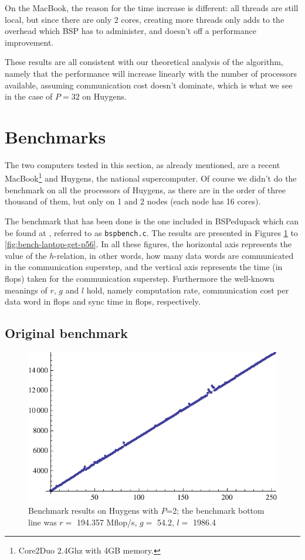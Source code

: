 \documentclass[a4paper]{article}
\begin{document}
On the MacBook, the reason for the time increase is different: all threads are
still local, but since there are only 2 cores, creating more threads only adds
to the overhead which BSP has to administer, and doesn't off a performance
improvement. 

These results are all consistent with our theoretical analysis of the algorithm,
namely that the performance will increase linearly with the number of processors
available, assuming communication cost doesn't dominate, which is what we see in
the case of $P=32$ on Huygens. 

\section{Benchmarks}\label{sec:bench}

The two computers tested in this section, as already mentioned, are a recent
MacBook\footnote{Core2Duo 2.4Ghz with 4GB memory.} and Huygens, the national
supercomputer. Of course we didn't do the benchmark on all the processors of Huygens,
as there are in the order of three thousand of them, but only on 1 and 2 nodes
(each node has 16 cores). 

The benchmark that has been done is the one included in BSPedupack which can be
found at \cite{edupack}, referred to as \texttt{bspbench.c}. The results are
presented in Figures \ref{fig:bench-huy-put-p2} to
\ref{fig:bench-laptop-get-p56}. In all these figures, the horizontal axis
represents the value of the $h$-relation, in other words, how many data words
are communicated in the communication superstep, and the vertical axis
represents the time (in flops) taken for the communication superstep.
Furthermore the well-known meanings of $r$, $g$ and $l$ hold, namely computation
rate, communication cost per data word in flops and sync time in flops,
respectively. 

\subsection{Original benchmark}
\begin{figure}[h]
    \begin{center}
        \includegraphics{img/bench-huy-put-p2.pdf}
    \end{center}
    \caption{Benchmark results on Huygens with $P$=2; the benchmark bottom line
    was $r=$ 194.357 Mflop/s, $g=$ 54.2, $l=$ 1986.4}
    \label{fig:bench-huy-put-p2}
\end{figure}
\end{document}
